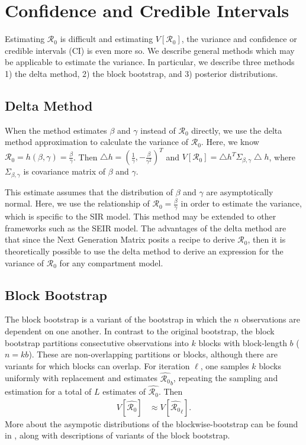 \message{ !name(draft_v13.tex)}\documentclass[12pt]{article}
\newcommand{\rr}{\ensuremath{\mathcal{R}_0}}
\begin{document}
\section{Confidence and Credible Intervals}
\label{sec:ci}

Estimating $\rr$ is difficult and estimating $V[\rr]$, the variance and confidence or credible intervals (CI) is even more so.  We describe general methods which may be applicable to estimate the variance.  In particular, we describe three methods 1) the delta method, 2) the block bootstrap, and 3) posterior distributions.




\subsection{Delta Method}\label{delta-method}

When the method estimates \(\beta\) and \(\gamma\) instead of \(\rr\) directly, we use the delta method approximation to calculate the
variance of \(\rr\). Here, we know \(\rr = h(\beta, \gamma) = \frac{\beta}{\gamma}\). Then \(\bigtriangleup h = (\frac{1}{\gamma},  -\frac{\beta}{\gamma^2})^T\) and \(V[\rr] = \bigtriangleup h^T \Sigma_{\beta, \gamma} \bigtriangleup h\), where \(\Sigma_{\beta, \gamma}\) is covariance matrix of \(\beta\) and \(\gamma\).

This estimate assumes that the distribution of $\beta$ and $\gamma$ are asymptotically normal.  Here, we use the relationship of $\rr = \frac{\beta}{\gamma}$ in order to estimate the variance, which is specific to the SIR model.  This method may be extended to other frameworks such as the SEIR model.  The advantages of the delta method are that since the Next Generation Matrix \citep{diekmann2009} posits a recipe to derive $\rr$, then it is theoretically possible to use the delta method to derive an expression for the variance of $\rr$ for any compartment model.

\subsection{Block Bootstrap}

The block bootstrap is a variant of the bootstrap in which the $n$ observations are dependent on one another.  In contrast to the original bootstrap, the block bootstrap partitions consectutive observations into $k$ blocks with block-length $b$ ($n=kb$).  These are non-overlapping partitions or blocks, although there are variants for which blocks can overlap.  For iteration $\ell$, one samples $k$ blocks uniformly with replacement and estimates $\hat{\rr}_b$, repeating the sampling and estimation for a total of $L$ estimates of $\hat{\rr}$.  Then
\begin{align*}
  V\left [ \hat{\rr} \right ] &\approx V\left [\hat{\rr}_\ell \right ].
\end{align*}
More about the asympotic distributions of the blockwise-bootstrap can be found in \cite{cao1999}, along with descriptions of variants of the block bootstrap.
\end{document}
